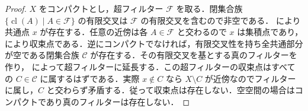 \begin{proof}
$X$ をコンパクトとし，超フィルター $\mathcal F$ を取る．閉集合族 $\{\operatorname{cl}(A)\mid A\in\mathcal F\}$ の有限交叉は $\mathcal F$ の有限交叉を含むので非空である． により共通点 $x$ が存在する．任意の近傍は各 $A\in\mathcal F$ と交わるので $x$ は集積点であり， により収束点である．逆にコンパクトでなければ，有限交叉性を持ち全共通部分が空である閉集合族 $\mathcal C$ が存在する．その有限交叉を基とする真のフィルターを作り， によって超フィルターに延長する．この超フィルターの収束点はすべての $C\in\mathcal C$ に属するはずである．実際 $x\notin C$ なら $X\setminus C$ が近傍なのでフィルターに属し，$C$ と交わらず矛盾する．従って収束点は存在しない．空空間の場合はコンパクトであり真のフィルターは存在しない．
\end{proof}
